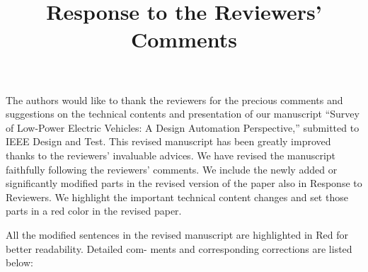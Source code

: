 \documentclass[onecolumn]{IEEEconf}
\title{Response to the Reviewers' Comments}
\begin{document}
\maketitle

The authors would like to thank the reviewers for the precious comments and suggestions on the technical contents and presentation of our manuscript ``Survey of Low-Power Electric Vehicles: A Design Automation Perspective,'' submitted to IEEE Design and Test. This revised manuscript has been greatly improved thanks to the reviewers' invaluable advices. We have revised the manuscript faithfully following the reviewers' comments. We include the newly added or significantly modified parts in the revised version of the paper also in Response to Reviewers. We highlight the important technical content changes and set those parts in a red color in the revised paper. 

All the modified sentences in the revised manuscript are highlighted in Red for better readability. Detailed com- ments and corresponding corrections are listed below:\\
\end{document}
